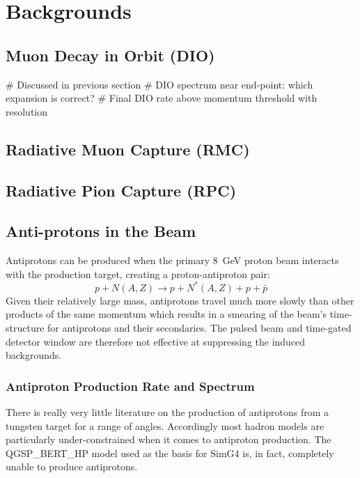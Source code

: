
\chapter{\phaseII Backgrounds}

\section{Muon Decay in Orbit (\acs{DIO})}
\begin{easylist}
# Discussed in previous section 
# DIO spectrum near end-point: which expansion is correct?
# Final DIO rate above momentum threshold with resolution
\end{easylist}

\section{Radiative Muon Capture (\acs{RMC})}

\section{Radiative Pion Capture (\acs{RPC})}

\section{Anti-protons in the Beam}
Antiprotons can be produced when the primary 8~GeV proton beam interacts with the production target, creating a proton-antiproton pair:
\begin{equation}
p + N(A,Z) \rightarrow p + N^*(A,Z) + p+\bar{p}
\end{equation}
Given their relatively large mass, antiprotons travel much more slowly than other products of the same momentum which results in a smearing of the beam's time-structure for antiprotons and their secondaries.
The pulsed beam and time-gated detector window are therefore not effective at suppressing the induced backgrounds.

\subsection{Antiproton Production Rate and Spectrum}
There is really very little literature on the production of antiprotons from a tungsten target for a range of angles.
Accordingly most hadron models are particularly under-constrained when it comes to antiproton production.
The QGSP_BERT_HP model used as the basis for SimG4 is, in fact, completely unable to produce antiprotons.

